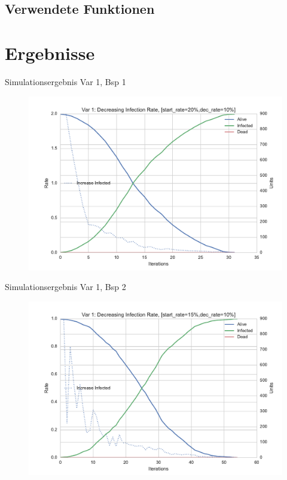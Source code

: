 \subsection{Verwendete Funktionen}
%

\section{Ergebnisse}
\begin{frame}[fragile]{Simulationsergebnis Var 1, Bsp 1}
    	\begin{figure}[h!]
    	\includegraphics[scale=0.5]{BSP27_Plot_1.pdf}
		\end{figure}
\end{frame}

\begin{frame}[fragile]{Simulationsergebnis Var 1, Bsp 2}
    	\begin{figure}[h!]
    	\includegraphics[scale=0.5]{BSP27_Plot_2.pdf}
		\end{figure}
\end{frame}

